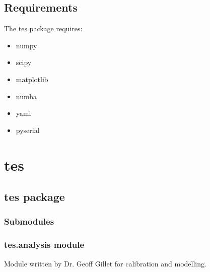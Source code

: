 \documentclass[letterpaper,10pt,english]{sphinxmanual}
\begin{document}
\begin{sphinxVerbatim}[commandchars=\\\{\}]
\end{sphinxVerbatim}


\subsection{Requirements}
\label{\detokenize{usage:requirements}}
\sphinxAtStartPar
The tes package requires:
\begin{itemize}
\item {} 
\sphinxAtStartPar
numpy

\item {} 
\sphinxAtStartPar
scipy

\item {} 
\sphinxAtStartPar
matplotlib

\item {} 
\sphinxAtStartPar
numba

\item {} 
\sphinxAtStartPar
yaml

\item {} 
\sphinxAtStartPar
pyserial

\end{itemize}


\section{tes}
\label{\detokenize{modules:tes}}\label{\detokenize{modules::doc}}

\subsection{tes package}
\label{\detokenize{tes:tes-package}}\label{\detokenize{tes::doc}}

\subsubsection{Submodules}
\label{\detokenize{tes:submodules}}

\subsubsection{tes.analysis module}
\label{\detokenize{tes:module-tes.analysis}}\label{\detokenize{tes:tes-analysis-module}}
\sphinxAtStartPar
Module written by Dr. Geoff Gillet for calibration and modelling.
\end{document}
